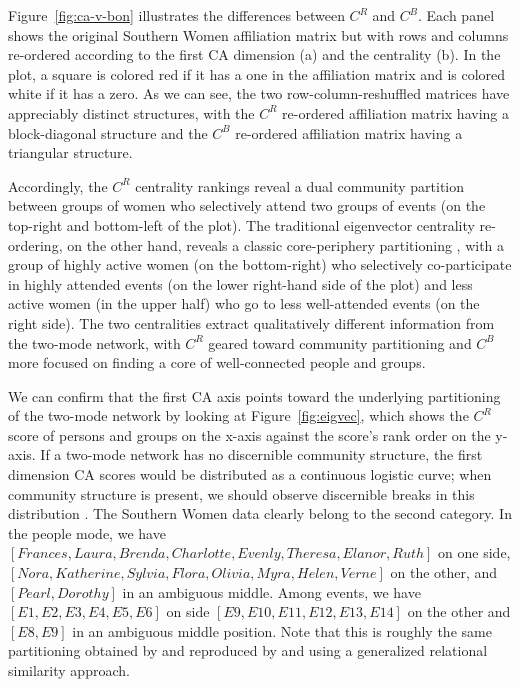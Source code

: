 \documentclass[a4paper,fleqn]{cas-sc}
\begin{document}
Figure~\ref{fig:ca-v-bon} illustrates the differences between $C^R$ and $C^B$. Each panel shows the original Southern Women affiliation matrix but with rows and columns re-ordered according to the first CA dimension (a) and the \citet{bonacich1991simultaneous} centrality (b). In the plot, a square is colored red if it has a one in the affiliation matrix and is colored white if it has a zero. As we can see, the two row-column-reshuffled matrices have appreciably distinct structures, with the $C^R$ re-ordered affiliation matrix having a block-diagonal structure and the $C^B$ re-ordered affiliation matrix having a triangular structure. 

Accordingly, the $C^R$ centrality rankings reveal a dual community partition between groups of women who selectively attend two groups of events (on the top-right and bottom-left of the plot). The traditional eigenvector centrality re-ordering, on the other hand, reveals a classic core-periphery partitioning \citep{borgatti2000models}, with a group of highly active women (on the bottom-right) who selectively co-participate in highly attended events (on the lower right-hand side of the plot) and less active women (in the upper half) who go to less well-attended events (on the right side). The two centralities extract qualitatively different information from the two-mode network, with $C^R$ geared toward community partitioning and $C^B$ more focused on finding a core of well-connected people and groups. 

We can confirm that the first CA axis points toward the underlying partitioning of the two-mode network by looking at Figure~\ref{fig:eigvec}, which shows the $C^R$ score of persons and groups on the x-axis against the score's rank order on the y-axis. If a two-mode network has no discernible community structure, the first dimension CA scores would be distributed as a continuous logistic curve; when community structure is present, we should observe discernible breaks in this distribution \citep{van2021correspondence}. The Southern Women data clearly belong to the second category. In the people mode, we have $\left[Frances, Laura, Brenda, Charlotte, Evenly, Theresa, Elanor, Ruth\right]$ on one side, $\left[Nora, Katherine, Sylvia, Flora, Olivia, Myra, Helen, Verne\right]$ on the other, and  $\left[Pearl, Dorothy\right]$ in an ambiguous middle. Among events, we have $\left[E1, E2, E3, E4, E5, E6\right]$ on side $\left[E9, E10, E11, E12, E13, E14\right]$ on the other and $\left[E8, E9\right]$ in an ambiguous middle position. Note that this is roughly the same partitioning obtained by \citep{doreian2004generalized} and reproduced by \citet{kovacs2010generalized} and \citet{lizardo2024two} using a generalized relational similarity approach. 
\end{document}

